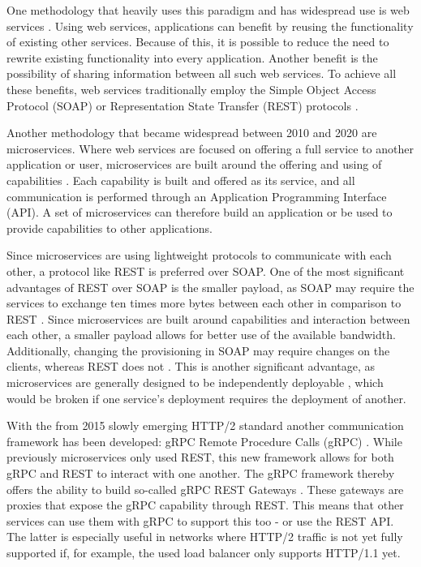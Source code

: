 \documentclass[conference]{IEEEtran}
\begin{document}
One methodology that heavily uses this paradigm and has widespread use is web services \cite{halili2018web}. Using web services, applications can benefit by reusing the functionality of existing other services. Because of this, it is possible to reduce the need to rewrite existing functionality into every application. Another benefit is the possibility of sharing information between all such web services. To achieve all these benefits, web services traditionally employ the Simple Object Access Protocol (SOAP) or Representation State Transfer (REST) protocols \cite{halili2018web}.

Another methodology that became widespread between 2010 and 2020 are microservices. Where web services are focused on offering a full service to another application or user, microservices are built around the offering and using of capabilities \cite{karmel2016nist}. Each capability is built and offered as its service, and all communication is performed through an Application Programming Interface (API). A set of microservices can therefore build an application or be used to provide capabilities to other applications.

Since microservices are using lightweight protocols \cite{karmel2016nist} to communicate with each other, a protocol like REST is preferred over SOAP. One of the most significant advantages of REST over SOAP is the smaller payload, as SOAP may require the services to exchange ten times more bytes between each other in comparison to REST \cite{halili2018web}. Since microservices are built around capabilities and interaction between each other, a smaller payload allows for better use of the available bandwidth.
Additionally, changing the provisioning in SOAP may require changes on the clients, whereas REST does not \cite{halili2018web}. This is another significant advantage, as microservices are generally designed to be independently deployable \cite{karmel2016nist}, which would be broken if one service's deployment requires the deployment of another.

With the from 2015 slowly emerging HTTP/2 standard \cite{rfc7540} another communication framework has been developed: gRPC Remote Procedure Calls (gRPC) \cite{GRPCAuthors2020}. While previously microservices only used REST, this new framework allows for both gRPC and REST to interact with one another. The gRPC framework thereby offers the ability to build so-called gRPC REST Gateways \cite{grpcrest}. These gateways are proxies that expose the gRPC capability through REST. This means that other services can use them with gRPC to support this too - or use the REST API. The latter is especially useful in networks where HTTP/2 traffic is not yet fully supported if, for example, the used load balancer only supports HTTP/1.1 yet.
\end{document}
